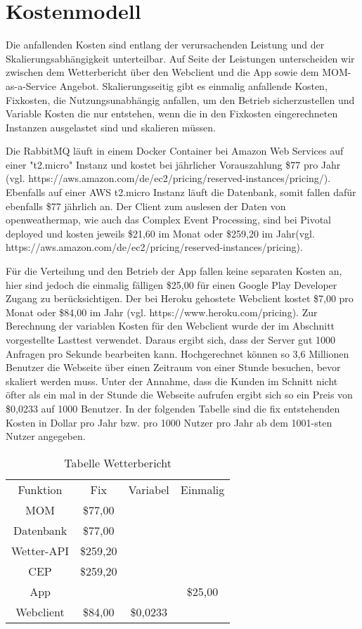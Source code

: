 \section{Kostenmodell}
Die anfallenden Kosten sind entlang der verursachenden Leistung und der Skalierungsabhängigkeit unterteilbar. Auf Seite der Leistungen unterscheiden wir zwischen dem Wetterbericht über den Webclient und die App sowie dem MOM-as-a-Service Angebot. Skalierungsseitig gibt es einmalig anfallende Kosten, Fixkosten, die Nutzungsunabhängig anfallen, um den Betrieb sicherzustellen und Variable Kosten die nur entstehen, wenn die in den Fixkosten eingerechneten Instanzen ausgelastet sind und skalieren müssen.

Die RabbitMQ läuft in einem Docker Container bei Amazon Web Services auf einer "t2.micro" Instanz und kostet bei jährlicher Vorauszahlung \$77 pro Jahr (vgl. https://aws.amazon.com/de/ec2/pricing/reserved-instances/pricing/). Ebenfalls auf einer AWS t2.micro Instanz läuft die Datenbank, somit fallen dafür ebenfalls \$77 jährlich an. Der Client zum auslesen der Daten von openweathermap, wie auch das Complex Event Processing, sind bei Pivotal deployed und kosten jeweils \$21,60 im Monat oder \$259,20 im Jahr(vgl. https://aws.amazon.com/de/ec2/pricing/reserved-instances/pricing). 


Für die Verteilung und den Betrieb der App fallen keine separaten Kosten an, hier sind jedoch die einmalig fälligen \$25,00 für einen Google Play Developer Zugang zu berücksichtigen. Der bei Heroku gehostete Webclient kostet \$7,00 pro Monat oder \$84,00 im Jahr (vgl. https://www.heroku.com/pricing). Zur Berechnung der variablen Kosten für den Webclient wurde der im Abschnitt  vorgestellte Lasttest verwendet. Daraus ergibt sich, dass der Server gut 1000 Anfragen pro Sekunde bearbeiten kann. Hochgerechnet können so 3,6 Millionen Benutzer die Webseite über einen Zeitraum von einer Stunde besuchen, bevor skaliert werden muss. Unter der Annahme, dass die Kunden im Schnitt nicht öfter als ein mal in der Stunde die Webseite aufrufen ergibt sich so ein Preis von \$0,0233 auf 1000 Benutzer. In der folgenden Tabelle sind die fix entstehenden Kosten in Dollar pro Jahr bzw. pro 1000 Nutzer pro Jahr ab dem 1001-sten Nutzer angegeben.

\begin{table}
\caption{Tabelle Wetterbericht}
\centering
\begin{tabular}{cccc}
	Funktion 	& Fix		& Variabel	& Einmalig \\
	MOM 		& \$77,00	&  			& \\
	Datenbank	& \$77,00	&			& \\
	Wetter-API 	& \$259,20	&	 		& \\
	CEP 		& \$259,20	& 			& \\
	App			&			&			& \$25,00 \\
	Webclient	& \$84,00	& \$0,0233	& \\
\end{tabular}
\end{table}

